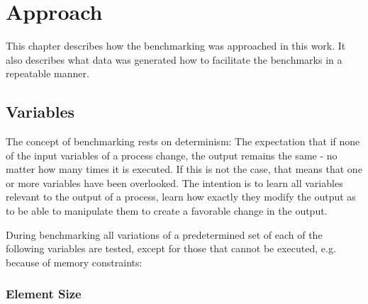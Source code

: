 
\chapter{Approach}
\label{chap:appr}

This chapter describes how the benchmarking was approached in this work. It also describes what data was generated how to facilitate the benchmarks in a repeatable manner.


\section{Variables}

The concept of benchmarking rests on determinism: The expectation that if none of the input variables of a process change, the output remains the same - no matter how many times it is executed. If this is not the case, that means that one or more variables have been overlooked. The intention is to learn all variables relevant to the output of a process, learn how exactly they modify the output as to be able to manipulate them to create a favorable change in the output.



During benchmarking all variations of a predetermined set of each of the following variables are tested, except for those that cannot be executed, e.g. because of memory constraints:

\subsection{Element Size}

